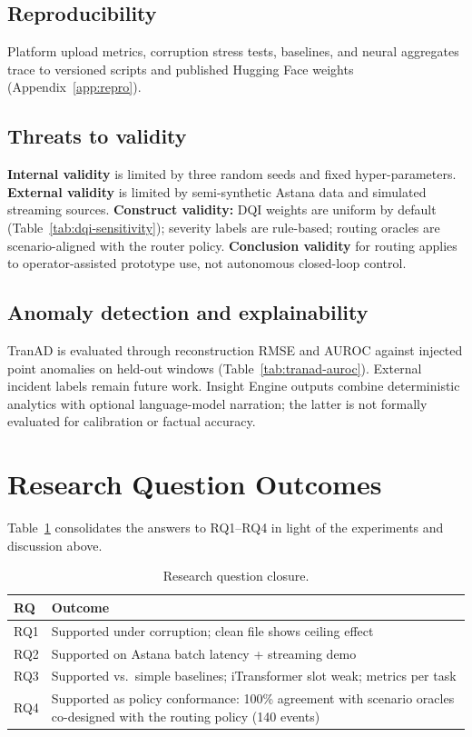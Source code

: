 \subsection{Reproducibility}

Platform upload metrics, corruption stress tests, baselines, and neural aggregates trace to versioned scripts and published Hugging Face weights (Appendix~\ref{app:repro}).

\subsection{Threats to validity}

\textbf{Internal validity} is limited by three random seeds and fixed hyper-parameters. \textbf{External validity} is limited by semi-synthetic Astana data and simulated streaming sources. \textbf{Construct validity:} DQI weights are uniform by default (Table~\ref{tab:dqi-sensitivity}); severity labels are rule-based; routing oracles are scenario-aligned with the router policy. \textbf{Conclusion validity} for routing applies to operator-assisted prototype use, not autonomous closed-loop control.

\subsection{Anomaly detection and explainability}

TranAD is evaluated through reconstruction RMSE and AUROC against injected point anomalies on held-out windows (Table~\ref{tab:tranad-auroc}). External incident labels remain future work. Insight Engine outputs combine deterministic analytics with optional language-model narration; the latter is not formally evaluated for calibration or factual accuracy.

\section{Research Question Outcomes}

Table~\ref{tab:rq-closure} consolidates the answers to RQ1--RQ4 in light of the experiments and discussion above.

\begin{table}[H]
  \centering
  \caption{Research question closure.}
  \label{tab:rq-closure}
  \small
  \begin{tabular}{@{}p{1.2cm}p{9.2cm}@{}}
    \toprule
    \textbf{RQ} & \textbf{Outcome} \\
    \midrule
    RQ1 & Supported under corruption; clean file shows ceiling effect \\
    RQ2 & Supported on Astana batch latency + streaming demo \\
    RQ3 & Supported vs.\ simple baselines; iTransformer slot weak; metrics per task \\
    RQ4 & Supported as policy conformance: 100\% agreement with scenario oracles co-designed with the routing policy (140 events) \\
    \bottomrule
  \end{tabular}
\end{table}

